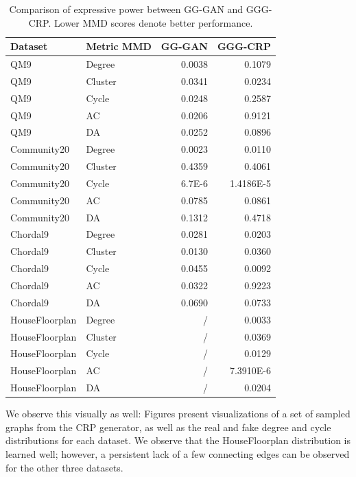 \begin{table}[H]
\centering
\caption[Comparison of expressive power between GG-GAN and GGG-CRP.]{Comparison of expressive power between GG-GAN and GGG-CRP. Lower MMD scores denote better performance.}
\label{tab:expressive_power}
\begin{tabular}{llrr}
\toprule
Dataset & Metric MMD & GG-GAN & GGG-CRP \\
\midrule
QM9 & Degree & 0.0038 & 0.1079\\
QM9 & Cluster & 0.0341 & 0.0234 \\
QM9 & Cycle & 0.0248 & 0.2587 \\
QM9 & AC & 0.0206 & 0.9121 \\
QM9 & DA & 0.0252 & 0.0896 \\
Community20 & Degree & 0.0023 & 0.0110 \\
Community20 & Cluster & 0.4359 & 0.4061 \\
Community20 & Cycle & 6.7E-6 & 1.4186E-5 \\
Community20 & AC & 0.0785 & 0.0861 \\
Community20 & DA & 0.1312 & 0.4718 \\
Chordal9 & Degree & 0.0281 & 0.0203 \\
Chordal9 & Cluster & 0.0130 & 0.0360 \\
Chordal9 & Cycle & 0.0455 & 0.0092 \\
Chordal9 & AC & 0.0322 & 0.9223 \\
Chordal9 & DA & 0.0690 & 0.0733 \\
HouseFloorplan & Degree & / & 0.0033 \\
HouseFloorplan & Cluster & / & 0.0369 \\
HouseFloorplan & Cycle & / & 0.0129 \\
HouseFloorplan & AC & / & 7.3910E-6 \\
HouseFloorplan & DA & / & 0.0204 \\
\bottomrule
\end{tabular}
\end{table}

We observe this visually as well: Figures  present visualizations of a set of sampled graphs from the CRP generator, as well as the real and fake degree and cycle distributions for each dataset. We observe that the HouseFloorplan distribution is learned well; however, a persistent lack of a few connecting edges can be observed for the other three datasets.

